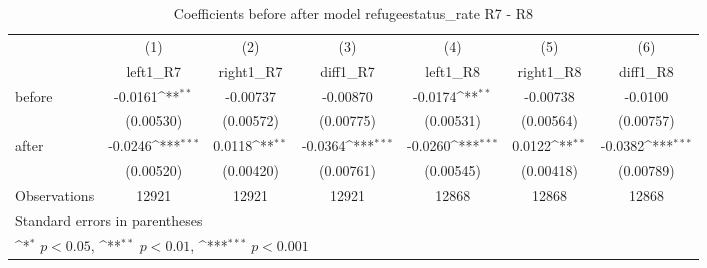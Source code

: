 \begin{table}[htbp]\centering
\def\sym#1{\ifmmode^{#1}\else\(^{#1}\)\fi}
\caption{Coefficients before after model refugeestatus\_rate R7 - R8}
\begin{tabular}{l*{6}{c}}
\hline\hline
                    &\multicolumn{1}{c}{(1)}&\multicolumn{1}{c}{(2)}&\multicolumn{1}{c}{(3)}&\multicolumn{1}{c}{(4)}&\multicolumn{1}{c}{(5)}&\multicolumn{1}{c}{(6)}\\
                    &\multicolumn{1}{c}{left1\_R7}&\multicolumn{1}{c}{right1\_R7}&\multicolumn{1}{c}{diff1\_R7}&\multicolumn{1}{c}{left1\_R8}&\multicolumn{1}{c}{right1\_R8}&\multicolumn{1}{c}{diff1\_R8}\\
\hline
before              &     -0.0161\sym{**} &    -0.00737         &    -0.00870         &     -0.0174\sym{**} &    -0.00738         &     -0.0100         \\
                    &   (0.00530)         &   (0.00572)         &   (0.00775)         &   (0.00531)         &   (0.00564)         &   (0.00757)         \\
[1em]
after               &     -0.0246\sym{***}&      0.0118\sym{**} &     -0.0364\sym{***}&     -0.0260\sym{***}&      0.0122\sym{**} &     -0.0382\sym{***}\\
                    &   (0.00520)         &   (0.00420)         &   (0.00761)         &   (0.00545)         &   (0.00418)         &   (0.00789)         \\
\hline
Observations        &       12921         &       12921         &       12921         &       12868         &       12868         &       12868         \\
\hline\hline
\multicolumn{7}{l}{\footnotesize Standard errors in parentheses}\\
\multicolumn{7}{l}{\footnotesize \sym{*} \(p<0.05\), \sym{**} \(p<0.01\), \sym{***} \(p<0.001\)}\\
\end{tabular}
\end{table}
